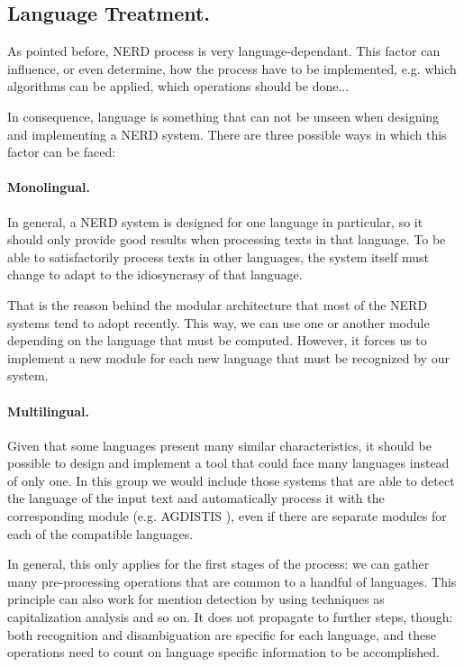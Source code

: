 \subsection{Language Treatment.}

As pointed before, NERD process is very language-dependant. This factor can influence, or even determine, how the process have to be implemented, e.g. which algorithms can be applied, which operations should be done...

In consequence, language is something that can not be unseen when designing and implementing a NERD system. There are three possible ways in which this factor can be faced:

\paragraph{Monolingual.}

In general, a NERD system is designed for one language in particular, so it should only provide good results when processing texts in that language. To be able to satisfactorily process texts in other languages, the system itself must change to adapt to the idiosyncrasy of that language. 

That is the reason behind the modular architecture that most of the  NERD systems tend to adopt recently. This way, we can use one or another module depending on the language that must be computed. However, it forces us to implement a new module for each new language that must be recognized by our system.

\paragraph{Multilingual.}

Given that some languages present many similar characteristics, it should be possible to design and implement a tool that could face many languages instead of only one. In this group we would include those systems that are able to detect the language of the input text and automatically process it with the corresponding module (e.g. AGDISTIS \cite{gerbil2015}), even if there are separate modules for each of the compatible languages.

In general, this only applies for the first stages of the process: we can gather many pre-processing operations that are common to a handful of languages. This principle can also work for mention detection by using techniques as capitalization analysis and so on. It does not propagate to further steps, though: both recognition and disambiguation are specific for each language, and these operations need to count on language specific information to be accomplished.

